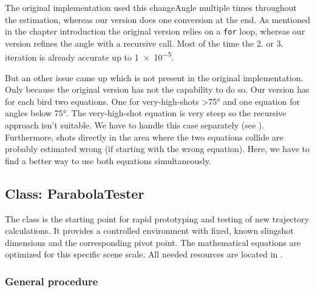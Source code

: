 The original implementation used this changeAngle multiple times throughout the estimation, whereas our version does one conversion at the end. As mentioned in the chapter introduction the original version relies on a \texttt{for} loop, whereas our version refines the angle with a recursive call. Most of the time the \num{2}. or \num{3}. iteration is already accurate up to \num{1e-5}.

But an other issue came up which is not present in the original implementation. Only because the original version has not the capability to do so. Our version has for each bird two equations. One for very-high-shots \ang{>75} and one equation for angles below \ang{75}. The very-high-shot equation is very steep so the recursive approach isn't suitable. We have to handle this case separately (see ). Furthermore, shots directly in the area where the two equations collide are probably estimated wrong (if starting with the wrong equation). Here, we have to find a better way to use both equations simultaneously.




\subsection{Class: ParabolaTester}\label{ch:shot:tester}

The  class is the starting point for rapid prototyping and testing of new trajectory calculations. It provides a controlled environment with fixed, known slingshot dimensions and the corresponding pivot point. The mathematical equations are optimized for this specific scene scale. All needed resources are located in .


\subsubsection{General procedure}

